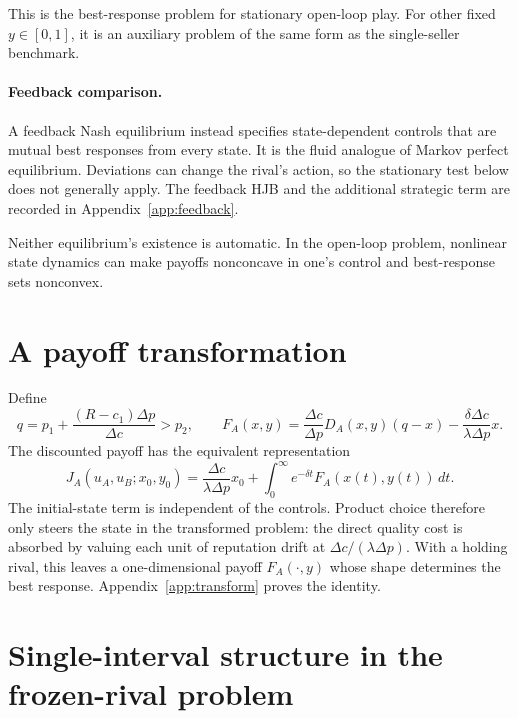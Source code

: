 \documentclass[11pt]{article}
\theoremstyle{definition}
\begin{document}
This is the best-response problem for stationary open-loop play. For other
fixed $y\in[0,1]$, it is an auxiliary problem of the same form as the
single-seller benchmark.

\paragraph{Feedback comparison.}
A feedback Nash equilibrium instead specifies state-dependent controls
that are mutual best responses from every state. It is the fluid analogue
of Markov perfect equilibrium. Deviations can change the rival's action,
so the stationary test below does not generally apply. The feedback HJB
and the additional strategic term are recorded in
Appendix~\ref{app:feedback}.

Neither equilibrium's existence is automatic. In the open-loop problem,
nonlinear state dynamics can make payoffs nonconcave in one's control and
best-response sets nonconvex.

\section{A payoff transformation}\label{sec:transformation}

Define
\begin{equation*}
q=p_1+\frac{(R-c_1)\Delta p}{\Delta c}>p_2,
\qquad
F_A(x,y)=\frac{\Delta c}{\Delta p}D_A(x,y)(q-x)
-\frac{\delta\Delta c}{\lambda\Delta p}x.
\end{equation*}
The discounted payoff has the equivalent representation
\begin{equation}\label{eq:duopoly-transform}
J_A(u_A,u_B;x_0,y_0)=\frac{\Delta c}{\lambda\Delta p}x_0
+\int_0^\infty e^{-\delta t}F_A(x(t),y(t))\,dt.
\end{equation}
The initial-state term is independent of the controls. Product choice
therefore only steers the state in the transformed problem: the direct
quality cost is absorbed by valuing each unit of reputation drift at
$\Delta c/(\lambda\Delta p)$. With a holding rival, this leaves a
one-dimensional payoff $F_A(\cdot,y)$ whose shape determines the best
response. Appendix~\ref{app:transform} proves the identity.

\section{Single-interval structure in the frozen-rival problem}
\label{sec:frozen-single-interval}
\end{document}
